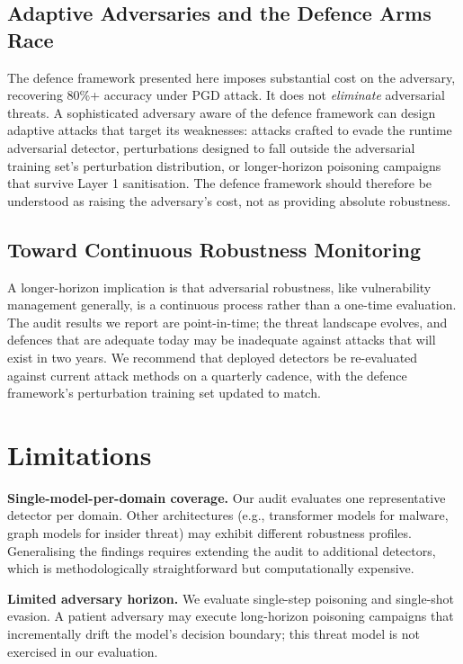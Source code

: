 \documentclass[sigconf,nonacm]{acmart}
\begin{document}
\subsection{Adaptive Adversaries and the Defence Arms Race}

The defence framework presented here imposes substantial cost on the
adversary, recovering 80\%+ accuracy under PGD attack. It does not
\emph{eliminate} adversarial threats. A sophisticated adversary aware of the
defence framework can design adaptive attacks that target its weaknesses:
attacks crafted to evade the runtime adversarial detector, perturbations
designed to fall outside the adversarial training set's perturbation
distribution, or longer-horizon poisoning campaigns that survive Layer 1
sanitisation. The defence framework should therefore be understood as
raising the adversary's cost, not as providing absolute robustness.

\subsection{Toward Continuous Robustness Monitoring}

A longer-horizon implication is that adversarial robustness, like
vulnerability management generally, is a continuous process rather than a
one-time evaluation. The audit results we report are point-in-time; the
threat landscape evolves, and defences that are adequate today may be
inadequate against attacks that will exist in two years. We recommend that
deployed detectors be re-evaluated against current attack methods on a
quarterly cadence, with the defence framework's perturbation training set
updated to match.

\section{Limitations}

\textbf{Single-model-per-domain coverage.} Our audit evaluates one
representative detector per domain. Other architectures (e.g., transformer
models for malware, graph models for insider threat) may exhibit different
robustness profiles. Generalising the findings requires extending the audit
to additional detectors, which is methodologically straightforward but
computationally expensive.

\textbf{Limited adversary horizon.} We evaluate single-step poisoning and
single-shot evasion. A patient adversary may execute long-horizon poisoning
campaigns that incrementally drift the model's decision boundary; this
threat model is not exercised in our evaluation.
\end{document}
